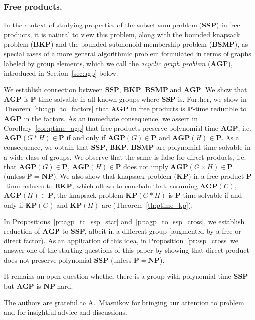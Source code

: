 \documentclass[10pt]{amsart}
\theoremstyle{definition}
\def\P{{\mathbf{P}}}
\def\NP{{\mathbf{NP}}}
\def\SSP{{\mathbf{SSP}}}
\def\BSMP{{\mathbf{BSMP}}}
\def\BKP{{\mathbf{BKP}}}
\def\KP{{\mathbf{KP}}}
\def\AGP{{\mathbf{AGP}}}
\begin{document}
\subsubsection{Free products.} In the context of studying properties of the subset sum problem ($\SSP$) in free products, it is natural to view this problem, along with the bounded knapsack problem ($\BKP$) and the bounded submonoid membership problem ($\BSMP$), %
as special cases of a more general algorithmic problem formulated in terms of graphs labeled by group elements, which we call the {\em acyclic graph problem} ($\AGP$), introduced in Section~\ref{sec:agp} below.

We establish connection between $\SSP$, $\BKP$, $\BSMP$ and $\AGP$. We show that $\AGP$ is $\P$-time solvable in all known groups where $\SSP$ is. Further, we show in Theorem~\ref{th:agp_to_factors} that $\AGP$ in free products is $\P$-time reducible to $\AGP$ in the factors. As an immediate consequence, we assert in Corollary~\ref{cor:ptime_agp} that free products preserve polynomial time $\AGP$, i.e. $\AGP(G* H)\in\P$ if and only if $\AGP(G)\in\P$ and $\AGP(H)\in\P$. As a consequence, we obtain that $\SSP$, $\BKP$, $\BSMP$ are polynomial time solvable in a wide class of groups. We observe that the same is false for direct products, i.e. that $\AGP(G)\in\P$, $\AGP(H)\in\P$ does not imply $\AGP(G\times H)\in\P$ (unless $\P=\NP$). We also show that knapsack problem ($\KP$) in a free product $\P$-time reduces to $\BKP$, which allows to conclude that, assuming $\AGP(G)$, $\AGP(H)\in\P$, the knapsack problem $\KP(G*H)$ is $\P$-time solvable if and only if $\KP(G)$ and $\KP(H)$ are (Theorem~\ref{th:ptime_kp}).

In Propositions~\ref{pr:agp_to_ssp_star} and~\ref{pr:agp_to_ssp_cross}, we establish reduction of $\AGP$ to $\SSP$, albeit in a different group (augmented by a free or direct factor). As an application of this idea, in Proposition~\ref{pr:ssp_cross} we answer one of the starting questions of this paper by showing that direct product does not preserve polynomial $\SSP$ (unless $\P=\NP$). %

It remains an open question whether there is a group with polynomial time $\SSP$ but $\AGP$ is $\NP$-hard.

The authors are grateful to A.~Miasnikov for bringing our attention to problem and for insightful advice and discussions.
\end{document}

